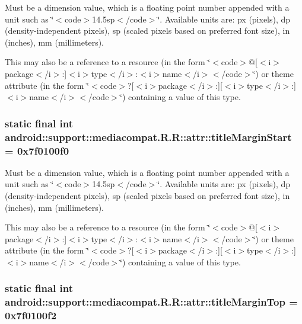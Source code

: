 Must be a dimension value, which is a floating point number appended with a unit such as \char`\"{}$<$code$>$14.5sp$<$/code$>$\char`\"{}. Available units are: px (pixels), dp (density-independent pixels), sp (scaled pixels based on preferred font size), in (inches), mm (millimeters). 

This may also be a reference to a resource (in the form \char`\"{}$<$code$>$@\mbox{[}$<$i$>$package$<$/i$>$:\mbox{]}$<$i$>$type$<$/i$>$:$<$i$>$name$<$/i$>$$<$/code$>$\char`\"{}) or theme attribute (in the form \char`\"{}$<$code$>$?\mbox{[}$<$i$>$package$<$/i$>$:\mbox{]}\mbox{[}$<$i$>$type$<$/i$>$:\mbox{]}$<$i$>$name$<$/i$>$$<$/code$>$\char`\"{}) containing a value of this type. \hypertarget{classandroid_1_1support_1_1mediacompat_1_1_r_1_1attr_6fe0fd44dc88921ba1016919677f3892}{
\subsubsection[{titleMarginStart}]{\setlength{\rightskip}{0pt plus 5cm}static final int android::support::mediacompat.R.R::attr::titleMarginStart = 0x7f0100f0}}
\label{classandroid_1_1support_1_1mediacompat_1_1_r_1_1attr_6fe0fd44dc88921ba1016919677f3892}


Must be a dimension value, which is a floating point number appended with a unit such as \char`\"{}$<$code$>$14.5sp$<$/code$>$\char`\"{}. Available units are: px (pixels), dp (density-independent pixels), sp (scaled pixels based on preferred font size), in (inches), mm (millimeters). 

This may also be a reference to a resource (in the form \char`\"{}$<$code$>$@\mbox{[}$<$i$>$package$<$/i$>$:\mbox{]}$<$i$>$type$<$/i$>$:$<$i$>$name$<$/i$>$$<$/code$>$\char`\"{}) or theme attribute (in the form \char`\"{}$<$code$>$?\mbox{[}$<$i$>$package$<$/i$>$:\mbox{]}\mbox{[}$<$i$>$type$<$/i$>$:\mbox{]}$<$i$>$name$<$/i$>$$<$/code$>$\char`\"{}) containing a value of this type. \hypertarget{classandroid_1_1support_1_1mediacompat_1_1_r_1_1attr_6ac6c0c6cddaa5ca2867c0a2cdf30cab}{
\subsubsection[{titleMarginTop}]{\setlength{\rightskip}{0pt plus 5cm}static final int android::support::mediacompat.R.R::attr::titleMarginTop = 0x7f0100f2}}
\label{classandroid_1_1support_1_1mediacompat_1_1_r_1_1attr_6ac6c0c6cddaa5ca2867c0a2cdf30cab}


